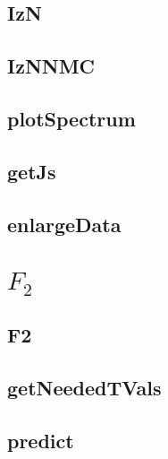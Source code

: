 \documentclass{book}
\begin{document}
\section{IzN}

\section{IzNNMC}

\section{plotSpectrum}

\section{getJs}

\section{enlargeData}


\chapter{$F_2$}

\section{F2}

\section{getNeededTVals}

\section{predict}

\end{document}
